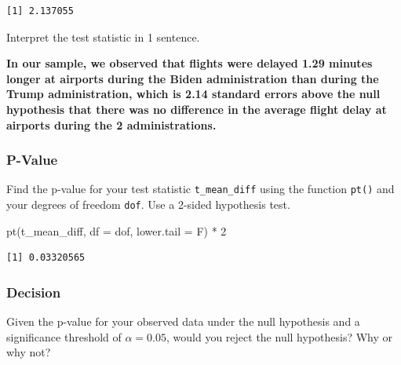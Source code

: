 \documentclass[
  letterpaper,
  DIV=11,
  numbers=noendperiod]{scrartcl}
\newenvironment{Shaded}{\begin{snugshade}}{\end{snugshade}}
\newcommand{\AttributeTok}[1]{\textcolor[rgb]{0.40,0.45,0.13}{#1}}
\newcommand{\DecValTok}[1]{\textcolor[rgb]{0.68,0.00,0.00}{#1}}
\newcommand{\FunctionTok}[1]{\textcolor[rgb]{0.28,0.35,0.67}{#1}}
\newcommand{\NormalTok}[1]{\textcolor[rgb]{0.00,0.23,0.31}{#1}}
\newcommand{\SpecialCharTok}[1]{\textcolor[rgb]{0.37,0.37,0.37}{#1}}
\begin{document}
\begin{verbatim}
[1] 2.137055
\end{verbatim}

Interpret the test statistic in 1 sentence.

\begin{tcolorbox}[enhanced jigsaw, toprule=.15mm, breakable, leftrule=.75mm, bottomrule=.15mm, rightrule=.15mm, colback=white, opacityback=0, colframe=quarto-callout-warning-color-frame, left=2mm, arc=.35mm]

\textbf{In our sample, we observed that flights were delayed 1.29
minutes longer at airports during the Biden administration than during
the Trump administration, which is 2.14 standard errors above the null
hypothesis that there was no difference in the average flight delay at
airports during the 2 administrations.}

\end{tcolorbox}

\subsubsection{P-Value}\label{p-value-1}

Find the p-value for your test statistic \texttt{t\_mean\_diff} using
the function \texttt{pt()} and your degrees of freedom \texttt{dof}. Use
a 2-sided hypothesis test.

\begin{Shaded}
\begin{Highlighting}[]
\FunctionTok{pt}\NormalTok{(t\_mean\_diff, }
   \AttributeTok{df =}\NormalTok{ dof, }
   \AttributeTok{lower.tail =}\NormalTok{ F) }\SpecialCharTok{*} \DecValTok{2}
\end{Highlighting}
\end{Shaded}

\begin{verbatim}
[1] 0.03320565
\end{verbatim}

\subsubsection{Decision}\label{decision-1}

Given the p-value for your observed data under the null hypothesis and a
significance threshold of \(\alpha=0.05\), would you reject the null
hypothesis? Why or why not?
\end{document}
